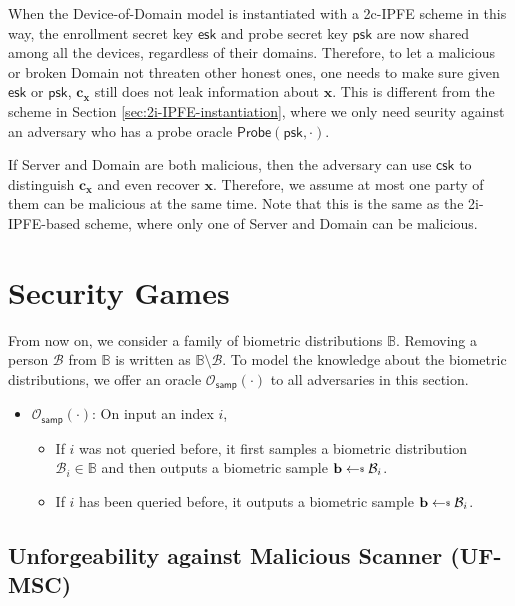 When the Device-of-Domain model is instantiated with a 2c-IPFE scheme in this way, the enrollment secret key $\textsf{esk}$ and probe secret key $\textsf{psk}$ are now shared among all the devices, regardless of their domains. Therefore, to let a malicious or broken \textsf{Domain} not threaten other honest ones, one needs to make sure given $\textsf{esk}$ or $\textsf{psk}$, $\mathbf{c_x}$ still does not leak information about $\mathbf{x}$. This is different from the scheme in Section \ref{sec:2i-IPFE-instantiation}, where we only need seurity against an adversary who has a probe oracle $\textsf{Probe}(\textsf{psk}, \cdot)$.

If \textsf{Server} and \textsf{Domain} are both malicious, then the adversary can use $\textsf{csk}$ to distinguish $\mathbf{c_x}$ and even recover $\mathbf{x}$. Therefore, we assume at most one party of them can be malicious at the same time. Note that this is the same as the 2i-IPFE-based scheme, where only one of \textsf{Server} and \textsf{Domain} can be malicious.



\section{Security Games}
\label{sec:security_game}

From now on, we consider a family of biometric distributions $\mathbb{B}$. Removing a person $\mathcal{B}$ from $\mathbb{B}$ is written as $\mathbb{B} \setminus \mathcal{B}$.
To model the knowledge about the biometric distributions, we offer an oracle $\mathcal{O}_\textsf{samp}(\cdot)$ to all adversaries in this section.

\begin{itemize}
	\item $\mathcal{O}_\textsf{samp}(\cdot)$: On input an index $i$,
	\begin{itemize}
		\item If $i$ was not queried before, it first samples a biometric distribution $\mathcal{B}_i \in \mathbb{B}$ and then outputs a biometric sample $\mathbf{b} \getsdollar \mathcal{B}_i$.
		\item If $i$ has been queried before, it outputs a biometric sample $\mathbf{b} \getsdollar \mathcal{B}_i$.
	\end{itemize}
\end{itemize}


\subsection{Unforgeability against Malicious Scanner (UF-MSC)}
\label{sec:uf-msc_game}

